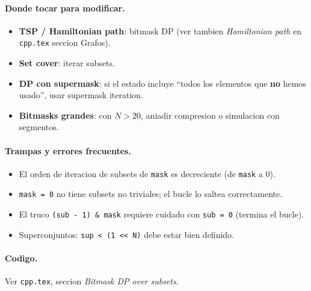 \paragraph{Donde tocar para modificar.}
\begin{itemize}\setlength\itemsep{0pt}
	\item \textbf{TSP / Hamiltonian path}: bitmask DP (ver tambien \textit{Hamiltonian path} en \texttt{cpp.tex} seccion Grafos).
	\item \textbf{Set cover}: iterar subsets.
	\item \textbf{DP con supermask}: si el estado incluye ``todos los elementos que \textbf{no} hemos usado'', usar supermask iteration.
	\item \textbf{Bitmasks grandes}: con $N > 20$, aniadir compresion o simulacion con segmentos.
\end{itemize}

\paragraph{Trampas y errores frecuentes.}
\begin{itemize}\setlength\itemsep{0pt}
	\item El orden de iteracion de subsets de \texttt{mask} es decreciente (de \texttt{mask} a $0$).
	\item \texttt{mask = 0} no tiene subsets no triviales; el bucle lo saltea correctamente.
	\item El truco \texttt{(sub - 1) \& mask} requiere cuidado con \texttt{sub = 0} (termina el bucle).
	\item Superconjuntos: \texttt{sup < (1 << N)} debe estar bien definido.
\end{itemize}

\paragraph{Codigo.}
Ver \texttt{cpp.tex}, seccion \textit{Bitmask DP over subsets}.

\vspace{0.5em}
